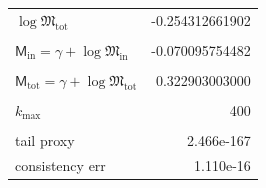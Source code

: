 \begin{table}[H]
\begin{tabular}{l r}
$\log\mathfrak{M}_{\mathrm{tot}}$ & -0.254312661902\\\\
$\mathsf{M}_{\mathrm{in}}=\gamma+\log\mathfrak{M}_{\mathrm{in}}$ & -0.070095754482\\\\
$\mathsf{M}_{\mathrm{tot}}=\gamma+\log\mathfrak{M}_{\mathrm{tot}}$ & 0.322903003000\\\\
$k_{\max}$ & 400\\\\
tail proxy & 2.466e-167\\
consistency err & 1.110e-16\\
\bottomrule
\end{tabular}
\end{table}
